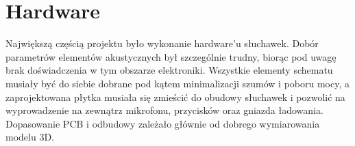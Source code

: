 \section{Hardware}

Największą częścią projektu było wykonanie hardware'u słuchawek. Dobór parametrów elementów akustycznych był szczególnie trudny, biorąc pod uwagę brak doświadczenia w tym obszarze elektroniki. Wszystkie elementy schematu musiały być do siebie dobrane pod kątem minimalizacji szumów i poboru mocy, a zaprojektowana płytka musiała się zmieścić do obudowy słuchawek i pozwolić na wyprowadzenie na zewnątrz mikrofonu, przycisków oraz gniazda ładowania. Dopasowanie PCB i odbudowy zależało głównie od dobrego wymiarowania modelu 3D.